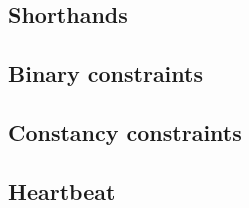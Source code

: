 \subsection{Shorthands}                      \label{block hash: generalities: shorthands}               
\subsection{Binary constraints}              \label{block hash: generalities: binary constraints}       
\subsection{Constancy constraints}           \label{block hash: generalities: constancy constraints}    
\subsection{Heartbeat}                       \label{block hash: generalities: heartbeat}                
